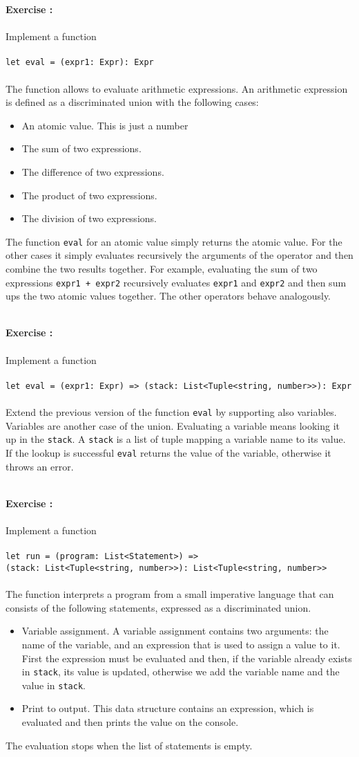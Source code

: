 \documentclass[]{article}
\newcounter{ExerciseCount}
\newcommand{\functionEx}[3]{
  Implement a function\\\\
   \texttt{let #1 = #2}\\\\ #3
}
\newcommand{\exercise}[1]{\noindent \textbf{Exercise \theExerciseCount:}\\\\ #1 \addtocounter{ExerciseCount}{1}
}
\begin{document}
\exercise{
  \functionEx{eval}{(expr1: Expr): Expr}{
  The function allows to evaluate arithmetic expressions. An arithmetic expression is defined as a discriminated union with the following cases:
  
  \begin{itemize}[noitemsep]
  \item An atomic value. This is just a number
  \item The sum of two expressions.
  \item The difference of two expressions.
  \item The product of two expressions.
  \item The division of two expressions.
  \end{itemize}
  
 The function \texttt{eval} for an atomic value simply returns the atomic value. For the other cases it simply evaluates recursively the arguments of the operator and then combine the two results together. For example, evaluating the sum of two expressions \texttt{expr1 + expr2} recursively evaluates \texttt{expr1} and \texttt{expr2} and then sum ups the two atomic values together. The other operators behave analogously.
}}\\

\exercise{
  \functionEx{eval}{(expr1: Expr) => (stack: List<Tuple<string, number>>): Expr}{
  Extend the previous version of the function \texttt{eval} by supporting also variables. Variables are another case of the union. Evaluating a variable means looking it up in the \texttt{stack}. A \texttt{stack} is a list of tuple mapping a variable name to its value. If the lookup is successful \texttt{eval} returns the value of the variable, otherwise it throws an error.
}}\\

\exercise{
  \functionEx{run}{(program: List<Statement>) =>\\ (stack: List<Tuple<string, number>>): List<Tuple<string, number>>}{
  The function interprets a program from a small imperative language that can consists of the following statements, expressed as a discriminated union.
  
  \begin{itemize}[noitemsep]
  \item Variable assignment. A variable assignment contains two arguments: the name of the variable, and an expression that is used to assign a value to it. First the expression must be evaluated and then, if the variable already exists in \texttt{stack}, its value is updated, otherwise we add the variable name and the value in \texttt{stack}.
  \item Print to output. This data structure contains an expression, which is evaluated and then prints the value on the console.
  \end{itemize}
  
  The evaluation stops when the list of statements is empty.
}}\\
\end{document}

